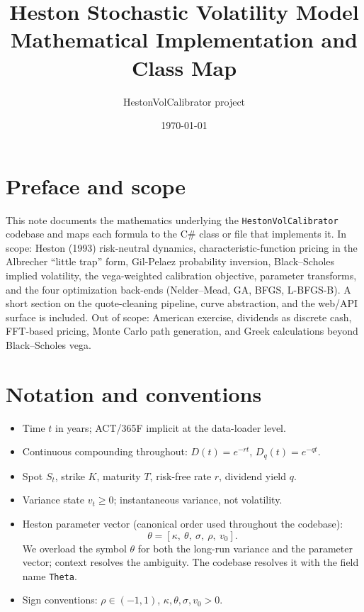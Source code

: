 \documentclass[11pt,a4paper]{article}
\title{Heston Stochastic Volatility Model\\\large Mathematical Implementation and Class Map}
\author{HestonVolCalibrator project}
\date{\today}
\begin{document}
\maketitle
\tableofcontents
\clearpage

\section{Preface and scope}
This note documents the mathematics underlying the \texttt{HestonVolCalibrator}
codebase and maps each formula to the C\# class or file that implements it.
In scope: Heston (1993) risk-neutral dynamics, characteristic-function pricing
in the Albrecher ``little trap'' form, Gil-Pelaez probability inversion, Black--Scholes
implied volatility, the vega-weighted calibration objective, parameter transforms,
and the four optimization back-ends (Nelder--Mead, GA, BFGS, L-BFGS-B). A short
section on the quote-cleaning pipeline, curve abstraction, and the web/API surface is included.
Out of scope: American exercise, dividends as discrete cash, FFT-based pricing,
Monte Carlo path generation, and Greek calculations beyond Black--Scholes vega.

\section{Notation and conventions}
\begin{itemize}
\item Time $t$ in years; ACT/365F implicit at the data-loader level.
\item Continuous compounding throughout: $D(t) = e^{-r t}$, $D_q(t) = e^{-q t}$.
\item Spot $S_t$, strike $K$, maturity $T$, risk-free rate $r$, dividend yield $q$.
\item Variance state $v_t \ge 0$; instantaneous variance, not volatility.
\item Heston parameter vector (canonical order used throughout the codebase):
\[
\theta = [\kappa,\ \theta,\ \sigma,\ \rho,\ v_0].
\]
We overload the symbol $\theta$ for both the long-run variance and the parameter vector;
context resolves the ambiguity. The codebase resolves it with the field name \texttt{Theta}.
\item Sign conventions: $\rho \in (-1, 1)$, $\kappa, \theta, \sigma, v_0 > 0$.
\end{itemize}
\end{document}
